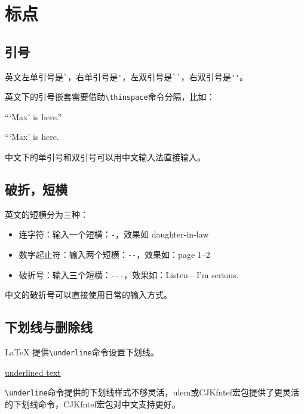 \section{标点}\label{sec:punctuations}
\subsection{引号}
英文左单引号是\lstinline|`|，右单引号是\lstinline|'|，左双引号是\lstinline|``|，右双引号是\lstinline|''|。

英文下的引号嵌套需要借助\lstinline|\thinspace|命令分隔，比如：

\begin{codeshow}
    ``\thinspace`Max' is here.''

    ```Max' is here.
\end{codeshow}

中文下的单引号和双引号可以用中文输入法直接输入。

\subsection{破折，短横}
英文的短横分为三种：
\begin{itemize}
    \item 连字符：输入一个短横：\lstinline|-|，效果如 daughter-in-law
    \item 数字起止符：输入两个短横：\lstinline|--|，效果如：page 1--2
    \item 破折号：输入三个短横：\lstinline|---|，效果如：Listen—I’m serious.
\end{itemize}

中文的破折号可以直接使用日常的输入方式。

\subsection{下划线与删除线}\label{subsec:decor}

\LaTeX{} 提供\lstinline{\underline}命令设置下划线。

\begin{codeshow}
  \underline{underlined text}
\end{codeshow}

\lstinline{\underline}命令提供的下划线样式不够灵活，ulem或CJKfntef宏包提供了更灵活的下划线命令，CJKfntef宏包对中文支持更好。

\begin{codeshow}
  \\
  \\
  \\
  \\
  \\
\end{codeshow}
